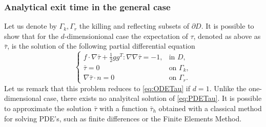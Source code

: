 \subsubsection{Analytical exit time in the general case}
Let us denote by $\Gamma_k,\Gamma_r$ the killing and reflecting subsets of $\partial D$. It is possible to show that for the $d$-dimensionional case the expectation of $\tau$, denoted as above as $\bar\tau$, is the solution of the following partial differential equation \cite{Krumscheid2015,Pavliotis2014}
\begin{equation}\label{eq:PDETau}
\begin{cases}
	f \cdot \nabla \bar\tau + \frac{1}{2} gg^T \colon \nabla \nabla \bar\tau = -1, & \text{in } D, \\
	\bar\tau = 0 & \text{on } \Gamma_k, \\
	\nabla \bar\tau \cdot n = 0 & \text{on } \Gamma_r. 
\end{cases}
\end{equation}
Let us remark that this problem reduces to \eqref{eq:ODETau} if $d=1$. Unlike the one-dimensional case, there exists no analyitcal solution of \eqref{eq:PDETau}. It is possible to approximate the solution $\bar\tau$ with a function $\bar\tau_h$ obtained with a classical method for solving PDE's, such as finite differences or the Finite Elements Method.

